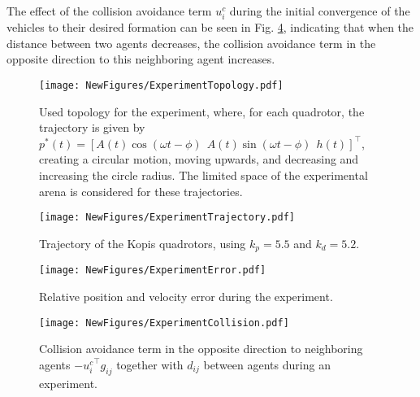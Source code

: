 The effect of the collision avoidance term $u_i^c$ during the initial convergence of the vehicles to their desired formation can be seen in Fig. \ref{fig:coll}, indicating that when the distance between two agents decreases, the collision avoidance term in the opposite direction to this neighboring agent increases.
\begin{figure}%
    \centering
    \vspace{0.2cm}
    \texttt{[image: NewFigures/ExperimentTopology.pdf]}
    \vspace{-0.5cm}
    \caption{Used topology for the experiment, where, for each quadrotor, the trajectory is given by $p^*(t) = \left[
        A(t)\cos(\omega t-\phi) \ \ A(t)\sin(\omega t-\phi) \ \ h(t)
    \right]^\top$, creating a circular motion, moving upwards, and decreasing and increasing the circle radius. The limited space of the experimental arena is considered for these trajectories.}
    \label{fig:exptopology}
\end{figure}
\begin{figure}%
    \centering
    \texttt{[image: NewFigures/ExperimentTrajectory.pdf]}
    \vspace{-0.5cm}
    \caption{Trajectory of the Kopis quadrotors, using $k_{p} = 5.5$ and $k_{d} = 5.2$.}
    \label{fig:exp13D}
\end{figure}

\begin{figure}%
	\centering
        \vspace{0.2cm}
	\texttt{[image: NewFigures/ExperimentError.pdf]}
    \vspace{-0.5cm}
	\caption{Relative position and velocity error during the experiment.}
	\label{fig:exp1err}
\end{figure}

% 
\begin{figure}%
	\centering
	\texttt{[image: NewFigures/ExperimentCollision.pdf]}
    \vspace{-0.5cm}
    \caption{Collision avoidance term in the opposite direction to neighboring agents $-{u_i^c}^\top g_{ij}$ together with $d_{ij}$ between agents during an experiment.}
	\label{fig:coll}
\end{figure}